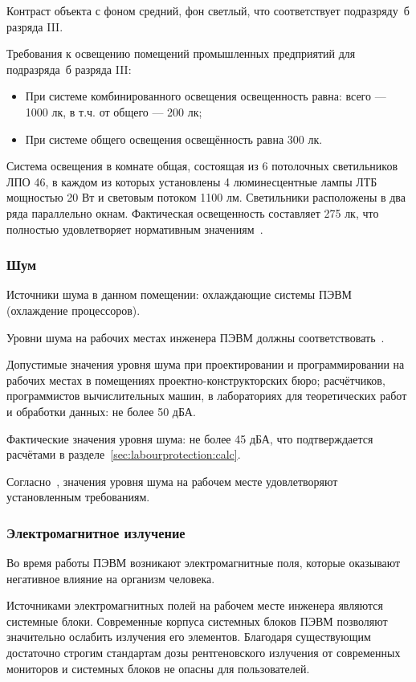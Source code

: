 Контраст объекта с фоном средний, фон светлый, что соответствует подразряду~б разряда III.

Требования к освещению помещений промышленных предприятий для подразряда~б разряда III:
\begin{itemize}
	\item При системе комбинированного освещения освещенность равна: всего --- 1000 лк, в т.ч. от общего --- 200 лк;
	\item При системе общего освещения освещённость равна 300 лк.
\end{itemize}

Система освещения в комнате общая, состоящая из 6 потолочных светильников ЛПО 46, в каждом из которых установлены 4 люминесцентные лампы ЛТБ мощностью 20 Вт и световым потоком 1100 лм. Светильники расположены в два ряда параллельно окнам. Фактическая освещенность составляет 275 лк, что полностью удовлетворяет нормативным значениям~\cite{SNiP23_05_95}.

\subsubsection{Шум}
Источники шума в данном помещении: охлаждающие системы ПЭВМ (охлаждение процессоров).

Уровни шума на рабочих местах инженера ПЭВМ должны соответствовать~\cite{GOST12_1_003}.

Допустимые значения уровня шума при проектировании и программировании на рабочих местах в помещениях проектно-конструкторских бюро; расчётчиков, программистов вычислительных машин, в лабораториях для теоретических работ и обработки данных: не более  50 дБА.

Фактические значения уровня шума: не более 45 дБА, что подтверждается расчётами в разделе~\ref{sec:labourprotection:calc}.

Согласно~\cite{GOST12_1_003}, значения уровня шума на рабочем месте удовлетворяют установленным требованиям.

\subsubsection{Электромагнитное излучение}
Во время работы ПЭВМ возникают электромагнитные поля, которые оказывают негативное влияние на организм человека.

Источниками электромагнитных полей на рабочем месте инженера являются системные блоки. Современные корпуса системных блоков ПЭВМ позволяют значительно ослабить излучения его элементов. Благодаря существующим достаточно строгим стандартам дозы рентгеновского излучения от современных мониторов и системных блоков не опасны для пользователей.

